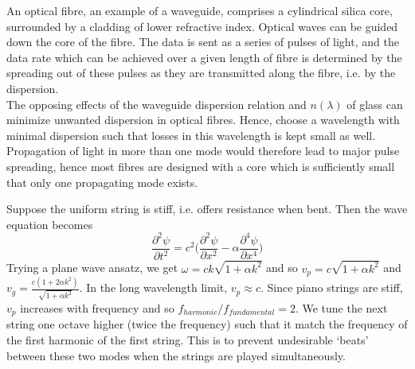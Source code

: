 \documentclass[a4paper]{article}
\begin{document}
\begin{eg}
An optical fibre, an example of a waveguide, comprises a cylindrical silica core, surrounded by a cladding of lower refractive index. Optical waves can be guided down the core of the fibre. The data is sent as a series of pulses of light, and the data rate which can be achieved over a given length of fibre is determined by the spreading out of these pulses as they are transmitted along the fibre, i.e. by the dispersion.\\[5pt]
The opposing effects of the waveguide dispersion relation and $n(\lambda)$ of glass can minimize unwanted dispersion in optical fibres. Hence, choose a wavelength with minimal dispersion such that losses in this wavelength is kept small as well.\\[5pt]
Propagation of light in more than one mode would therefore lead to major pulse spreading, hence most fibres are designed with a core which is sufficiently small that only one propagating mode exists.
\end{eg}
\begin{eg}
Suppose the uniform string is stiff, i.e. offers resistance when bent. Then the wave equation becomes
$$\frac{\partial^2\psi}{\partial t^2}=c^2\bigg(\frac{\partial^2\psi}{\partial x^2}-\alpha\frac{\partial^4\psi}{\partial x^4}\bigg)$$
Trying a plane wave ansatz, we get $\omega=ck\sqrt{1+\alpha k^2}$ and so $v_p=c\sqrt{1+\alpha k^2}$ and $v_g=\frac{c(1+2\alpha k^2)}{\sqrt{1+\alpha k^2}}$. In the long wavelength limit, $v_p\approx c$. Since piano strings are stiff, $v_p$ increases with frequency and so $f_{harmonic}/f_{fundamental}=2$. We tune the next string one octave higher (twice the frequency) such that it match the frequency of the first harmonic of the first string. This is to prevent undesirable `beats' between these two modes when the strings are played simultaneously.
\end{eg}
\end{document}
